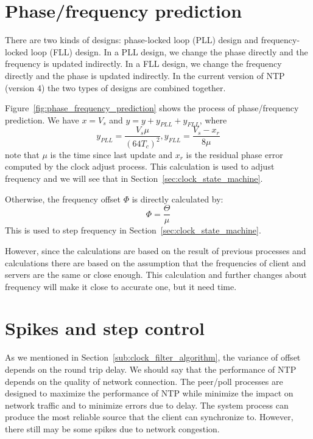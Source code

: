 


\section{Phase/frequency prediction}%
\label{sec:phase_frequency_prediction}
There are two kinds of designs: phase-locked loop (PLL) design and
frequency-locked loop (FLL) design. In a PLL design, we change the phase
directly and the frequency is updated indirectly. In a FLL design, we change
the frequency directly and the phase is updated indirectly. In the current version
of NTP (version 4) the two types of designs are combined together. 

Figure~\ref{fig:phase_frequency_prediction} shows the process of phase/frequency
prediction. We have $x = V_s$ and $y = y + y_{PLL} + y_{FLL}$, where
\begin{equation}
    y_{PLL} = \frac{V_s\mu}{\left(64T_c\right)^2},
    y_{FLL} = \frac{V_s-x_r}{8\mu}
    \label{eq:y_pll}
\end{equation}
note that $\mu$ is the time since last update and $x_r$ is the residual phase
error computed by the clock adjust process. This calculation is used to adjust
frequency and we will see that in Section~\ref{sec:clock_state_machine}.

Otherwise, the frequency offset $\Phi$ is directly calculated by:
\begin{equation}
    \Phi = \frac{\Theta}{\mu}
    \label{eq:frequency_offset}
\end{equation}
This is used to step frequency in Section~\ref{sec:clock_state_machine}. 

However, since the calculations are based on the result of previous processes
and calculations there are based on the assumption that the frequencies of client
and servers are the same or close enough. This calculation and further changes
about frequency will make it close to accurate one, but it need time.



\section{Spikes and step control}%
\label{sec:spikes_and_step_control}
As we mentioned in Section~\ref{sub:clock_filter_algorithm}, the variance of
offset depends on the round trip delay. We should say that the performance of
NTP depends on the quality of network connection. The peer/poll processes are
designed to maximize the performance of NTP while minimize the impact on
network traffic and to minimize errors due to delay. The system process can
produce the most reliable source that the client can synchronize to. However, 
there still may be some spikes due to network congestion. 


